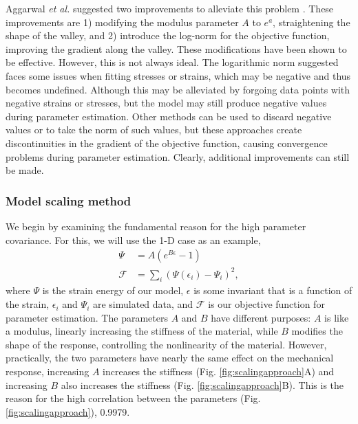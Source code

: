     Aggarwal \textit{et al.} suggested two improvements to alleviate this problem \cite{aggarwal_improved_2017}. These improvements are 1) modifying the modulus parameter $A$ to $e^{a}$, straightening the shape of the valley, and 2) introduce the log-norm for the objective function, improving the gradient along the valley. These modifications have been shown to be effective. However, this is not always ideal. The logarithmic norm suggested faces some issues when fitting stresses or strains, which may be negative and thus becomes undefined. Although this may be alleviated by forgoing data points with negative strains or stresses, but the model may still produce negative values during parameter estimation. Other methods can be used to discard negative values or to take the norm of such values, but these approaches create discontinuities in the gradient of the objective function, causing convergence problems during parameter estimation. Clearly, additional improvements can still be made. 


\subsubsection{Model scaling method}

	We begin by examining the fundamental reason for the high parameter covariance. For this, we will use the 1-D case as an example,
\begin{equation}
\begin{aligned}
\Psi &= A \left(e^{B \epsilon} - 1\right) \\
\mathcal{F} &= \sum_i \left(\Psi(\epsilon_i) - \Psi_i \right)^2,
\end{aligned}
\end{equation}
where $\Psi$ is the strain energy of our model, $\epsilon$ is some invariant that is a function of the strain, $\epsilon_i$ and $\Psi_i$ are simulated data, and $\mathcal{F}$ is our objective function for parameter estimation. The parameters $A$ and $B$ have different purposes: $A$ is like a modulus, linearly increasing the stiffness of the material, while $B$ modifies the shape of the response, controlling the nonlinearity of the material. However, practically, the two parameters have nearly the same effect on the mechanical response, increasing $A$ increases the stiffness (Fig. \ref{fig:scalingapproach}A) and increasing $B$ also increases the stiffness (Fig. \ref{fig:scalingapproach}B). This is the reason for the high correlation between the parameters (Fig. \ref{fig:scalingapproach}), 0.9979.


